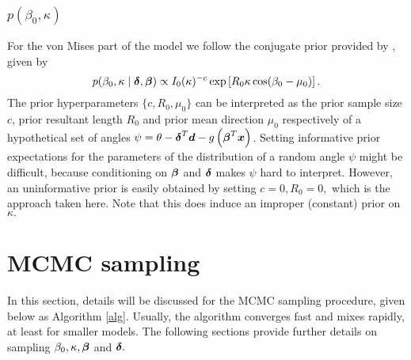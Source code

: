 \subsubsection{$p(\beta_0, \kappa)$}

For the von Mises part of the model we follow the conjugate prior provided by \citet{guttorp1988finding}, given by
\begin{equation}
p(\beta_0, \kappa \mid \boldsymbol{\delta}, \boldsymbol{\beta}) \propto I_0(\kappa)^{-c} \exp \left[ R_0 \kappa \cos(\beta_0 - \mu_0) \right].
\end{equation}
The prior hyperparameters \( \{ c, R_0, \mu_0 \} \) can be interpreted as the prior sample size \( c \), prior resultant length \( R_0 \) and prior mean direction \( \mu_0 \) respectively of a hypothetical set of angles \( \psi = \theta - \boldsymbol{\delta}^T \boldsymbol{d} - g\left(\boldsymbol{\beta}^T \boldsymbol{x} \right)\). Setting informative prior expectations for the parameters of the distribution of a random angle \(\psi\) might be difficult, because conditioning on \( \boldsymbol{\beta} \) and \( \boldsymbol{\delta} \) makes \( \psi \) hard to interpret. However, an uninformative prior is easily obtained by setting \( c = 0, R_0 = 0,\) which is the approach taken here. Note that this does induce an improper (constant) prior on \( \kappa.\) \label{priorb0kappa}


\section{MCMC sampling}

\label{MCMC}

In this section, details  will be discussed for the MCMC sampling procedure, given below as Algorithm \ref{alg}. Usually, the algorithm converges fast and mixes rapidly, at least for smaller models. The following sections provide further details on sampling \( \beta_0, \kappa, \boldsymbol{\beta} \) and \( \boldsymbol{\delta}.\)

